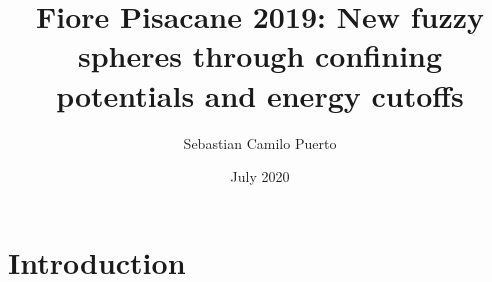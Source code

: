 \documentclass{article}
\title{Fiore Pisacane 2019: New fuzzy spheres through confining potentials and energy cutoffs}
\author{Sebastian Camilo Puerto}
\date{July 2020}
\begin{document}
\maketitle

\tableofcontents

\section{Introduction}
\end{document}
